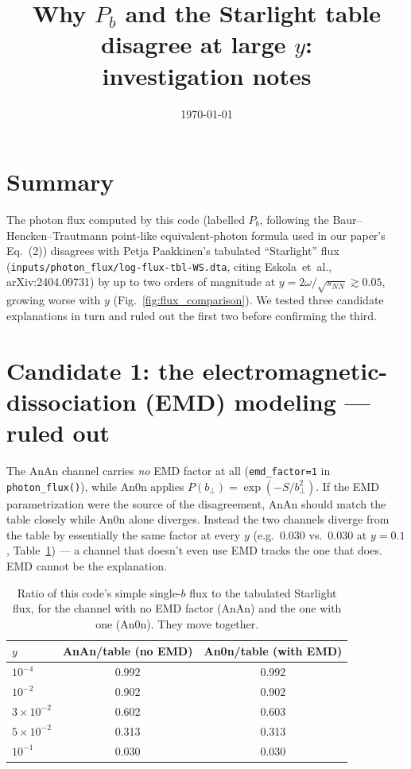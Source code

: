 \documentclass[11pt]{article}
\title{Why $P_b$ and the Starlight table disagree at large $y$:\\
investigation notes}
\author{}
\date{\today}
\begin{document}
\maketitle

\section{Summary}

The photon flux computed by this code (labelled $P_b$, following the
Baur--Hencken--Trautmann point-like equivalent-photon formula used in our
paper's Eq.~(2)) disagrees with Petja Paakkinen's tabulated ``Starlight''
flux (\texttt{inputs/photon\_flux/log-flux-tbl-WS.dta}, citing
Eskola~et~al., arXiv:2404.09731) by up to two orders of magnitude at
$y=2\omega/\sqrt{s_{NN}}\gtrsim0.05$, growing worse with $y$
(Fig.~\ref{fig:flux_comparison}). We tested three candidate explanations in
turn and ruled out the first two before confirming the third.

\section{Candidate 1: the electromagnetic-dissociation (EMD) modeling --- ruled out}

The AnAn channel carries \emph{no} EMD factor at all
(\texttt{emd\_factor=1} in \texttt{photon\_flux()}), while An0n applies
$P(b_\perp)=\exp(-S/b_\perp^2)$. If the EMD parametrization were the source
of the disagreement, AnAn should match the table closely while An0n alone
diverges. Instead the two channels diverge from the table by essentially
the same factor at every $y$ (e.g.\ $0.030$ vs.\ $0.030$ at $y=0.1$,
Table~\ref{tab:emd}) --- a channel that doesn't even use EMD tracks the one
that does. EMD cannot be the explanation.

\begin{table}[h]
\centering
\begin{tabular}{lcc}
\hline
$y$ & AnAn/table (no EMD) & An0n/table (with EMD) \\
\hline
$10^{-4}$ & 0.992 & 0.992 \\
$10^{-2}$ & 0.902 & 0.902 \\
$3\times10^{-2}$ & 0.602 & 0.603 \\
$5\times10^{-2}$ & 0.313 & 0.313 \\
$10^{-1}$ & 0.030 & 0.030 \\
\hline
\end{tabular}
\caption{Ratio of this code's simple single-$b$ flux to the tabulated
Starlight flux, for the channel with no EMD factor (AnAn) and the one with
one (An0n). They move together.}
\label{tab:emd}
\end{table}
\end{document}
